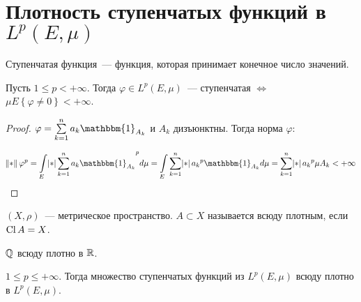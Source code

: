 \section{Плотность ступенчатых функций в $L^p (E, \mu)$}

\begin{definition}
    Ступенчатая функция~--- функция, которая принимает конечное число значений.
\end{definition}

\begin{lemma}
    Пусть $1 \le p < +\infty$. Тогда $\varphi \in L^p(E, \mu)$~--- ступенчатая $\Longleftrightarrow$
    $\mu E \left\{ \varphi \ne 0 \right\} < +\infty$.
\end{lemma}
\begin{proof}
    $\varphi = \sum\limits_{k=1}^{n} a_k \mathbbm{1}_{A_k}$ и $A_k$ дизъюнктны.
    Тогда норма $\varphi$:

    \[
        \norm{\varphi}^p = \int\limits_E \abs{\sum\limits_{k=1}^n a_k \mathbbm{1}_{A_k}}^p d\mu
        = \int\limits_E \sum\limits_{k=1}^n \abs{a_k}^p \mathbbm{1}_{A_k} d\mu
        = \sum\limits_{k=1}^n \abs{a_k}^p \mu A_k < +\infty
    \]
\end{proof}

\begin{definition}
    $(X, \rho)$~--- метрическое пространство.
    $A \subset X$ называется всюду плотным, если $\operatorname{Cl} A = X$.
\end{definition}

\begin{example}
    $\mathbb{Q}$ всюду плотно в $\mathbb{R}$.
\end{example}

\begin{theorem}
    $1 \le p \le +\infty$.
    Тогда множество ступенчатых функций из $L^p(E, \mu)$
    всюду плотно в $L^p(E, \mu)$.
\end{theorem}

